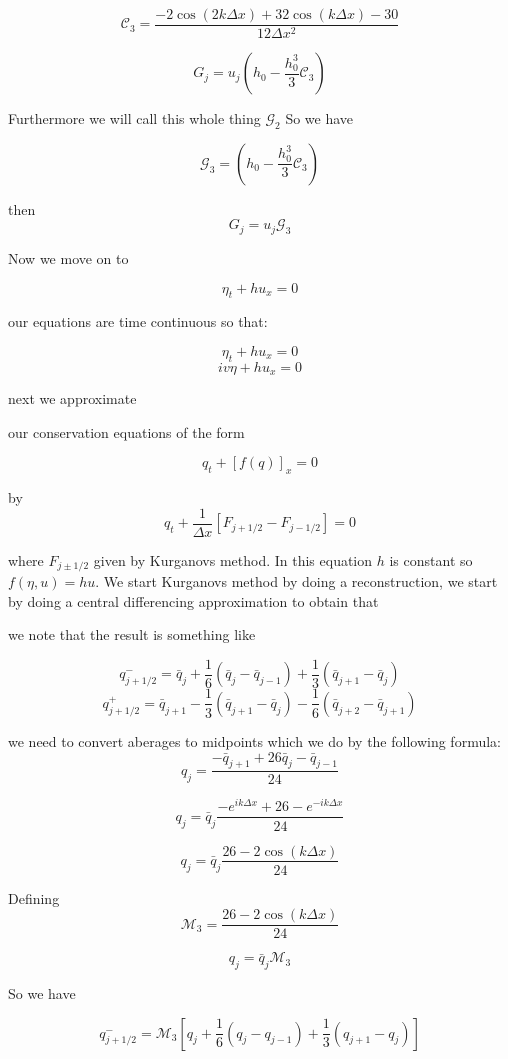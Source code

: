 \documentclass[12pt]{article}
\begin{document}
\[\mathcal{C}_3 = \dfrac{-2\cos\left(2k\Delta x\right) + 32\cos\left(k\Delta x \right) - 30 }{12\Delta x^2} \]

\[G_j = u_j \left( h_0 -  \frac{h_0^3}{3} \mathcal{C}_3 \right)\]

Furthermore we will call this whole thing $\mathcal{G}_2$ So we have

\[\mathcal{G}_3 = \left( h_0 -  \frac{h_0^3}{3} \mathcal{C}_3 \right)\]

then
\[G_j = u_j \mathcal{G}_3\]

Now we move on to 

\[\eta_t + h u_x = 0\]

our equations are time continuous so that:

\[\eta_t + h u_x = 0\]
\[iv\eta + h u_x = 0\]

next we approximate

our conservation equations of the form

\[q_t + \left[f(q)\right]_x = 0\]

by 
\[q_t + \frac{1}{\Delta x} \left[F_{j + 1/2} - F_{j - 1/2}\right]= 0\]

where $F_{j \pm 1/2}$ given by Kurganovs method. In this equation $h$ is constant so $f(\eta,u) = hu$. We start Kurganovs method by doing a reconstruction, we start by doing a central differencing approximation to obtain that

we note that the result is something like


\[q^-_{j + 1/2} = \bar{q}_j + \frac{1}{6}\left( \bar{q}_j - \bar{q}_{j-1}\right) + \frac{1}{3}\left( \bar{q}_{j+1} - \bar{q}_{j}\right)\]
\[q^+_{j + 1/2} = \bar{q}_{j+1} - \frac{1}{3}\left( \bar{q}_{j+1} - \bar{q}_{j}\right) - \frac{1}{6}\left( \bar{q}_{j+2} - \bar{q}_{j+1}\right)\]

we need to convert aberages to midpoints which we do by the following formula:
\[q_{j} =\frac{-\bar{q}_{j+1} +26\bar{q}_{j}  -\bar{q}_{j-1}}{24} \]

\[q_{j} = \bar{q}_{j}\frac{-e^{ik\Delta x} +26  -e^{-ik\Delta x}}{24} \]

\[q_{j} = \bar{q}_{j}\frac{26  -2\cos\left(k\Delta x\right)}{24} \]

Defining
\[\mathcal{M}_3= \frac{26  -2\cos\left(k\Delta x\right)}{24}\]

\[q_{j} = \bar{q}_{j}\mathcal{M}_3 \]

So we have

\[q^-_{j + 1/2} =\mathcal{M}_3\left[q_j + \frac{1}{6}\left( q_j - q_{j-1}\right) + \frac{1}{3}\left( q_{j+1} - q_{j}\right)\right]\]
\end{document}
